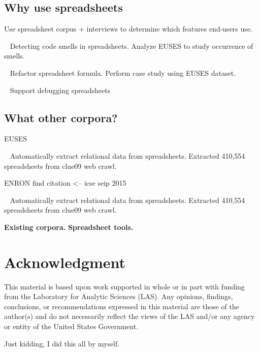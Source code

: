 \documentclass[conference]{IEEEtran}
\begin{document}

\subsection{Why use spreadsheets}

\cite{Chambers2010} Use spreadsheet corpus + interviews to determine which features end-users use.

~\cite{Pinzger2012} Detecting code smells in spreadsheets. Analyze EUSES to study occurrence of smells.

~\cite{Badame2012} Refactor spreadsheet formula. Perform case study using EUSES dataset.

~\cite{Abraham2007} Support debugging spreadsheets

\subsection{What other corpora?}
EUSES~\cite{Fisher2005}

~\cite{Chen2013} Automatically extract relational data from spreadsheets. Extracted 410,554 spreadsheets from clue09 web crawl.

ENRON find citation <-- icse seip 2015

~\cite{Chen2013} Automatically extract relational data from spreadsheets. Extracted 410,554 spreadsheets from clue09 web crawl.


\textbf{Existing corpora.}
\textbf{Spreadsheet tools.}





\section*{Acknowledgment}

This material is based upon work supported in whole or in part with funding from the Laboratory for Analytic Sciences (LAS). Any opinions, findings, conclusions, or recommendations expressed in this material are those of the author(s) and do not necessarily reflect the views of the LAS and/or any agency or entity of the United States Government.

Just kidding, I did this all by myself.



\raggedright




\end{document}
